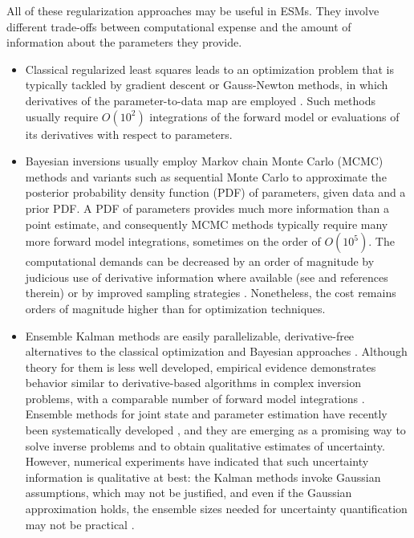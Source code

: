 \documentclass[draft]{agujournal}
\begin{document}
All of these regularization approaches may be useful in ESMs. They involve different trade-offs between computational expense and the amount of information about the parameters they provide. 
\begin{itemize}
\item Classical regularized least squares leads to an optimization problem that is typically tackled by gradient descent or Gauss-Newton methods, in which derivatives of the parameter-to-data map are employed \citep{Nocedal06a}. Such methods usually require $O(10^2)$ integrations of the forward model or evaluations of its derivatives with respect to parameters. 
\item Bayesian inversions usually employ Markov chain Monte Carlo (MCMC) methods \citep{Brooks11a} and variants such as sequential Monte Carlo \citep{Del-Moral06a} to approximate the posterior probability density function (PDF) of parameters, given data and a prior PDF. A PDF of parameters provides much more information than a point estimate, and consequently MCMC methods typically require many more forward model integrations, sometimes on the order of $O(10^5)$. The computational demands can be decreased by an order of magnitude by judicious use of derivative information where available (see \citet{Beskos17a} and references therein) or by improved sampling strategies \citep[e.g.,][]{Jackson08a,Jarvinen10a,Solonen12a}. Nonetheless, the cost remains orders of magnitude higher than for optimization techniques. 
\item Ensemble Kalman methods are easily parallelizable, derivative-free alternatives to the classical optimization and Bayesian approaches \citep{Houtekamer16a}. Although theory for them is less well developed, empirical evidence demonstrates behavior similar to derivative-based algorithms in complex inversion problems, with a comparable number of forward model integrations \citep{Iglesias16a}. Ensemble methods for joint state and parameter estimation have recently been systematically developed \citep{Bocquet13a,Bocquet14a,Carrassi17a}, and they are emerging as a promising way to solve inverse problems and to obtain qualitative estimates of uncertainty. However, numerical experiments have indicated that such uncertainty information is qualitative at best: the Kalman methods invoke Gaussian assumptions, which may not be justified, and even if the Gaussian approximation holds, the ensemble sizes needed for uncertainty quantification may not be practical \citep{Law12a,Iglesias13a}. 
\end{itemize}
\end{document}
